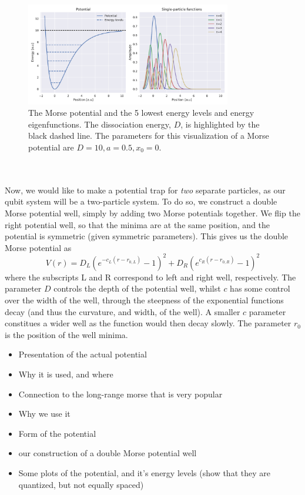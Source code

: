 \documentclass{subfiles}
\begin{document}
\begin{figure}
    \centering
    \includegraphics[width=0.8\textwidth]{figs/potential_spf.pdf}
    \caption{The Morse potential and the 5 lowest energy levels and energy eigenfunctions. The dissociation energy, $D$, is highlighted by the black dashed line. The parameters for this visualization of a Morse potential are $D=10, a=0.5, x_0=0$.}
    \label{fig:morse_potential}
\end{figure}


\\ \\Now, we would like to make a potential trap for \emph{two} separate particles, as our qubit system will be a two-particle system. To do so, we construct a double Morse potential well, simply by adding two Morse potentials together. We flip the right potential well, so that the minima are at the same position, and the potential is symmetric (given symmetric parameters). This gives us the double Morse potential as
\begin{equation}
    V(r) = D_L(e^{-c_L(r-r_{0,L})} - 1)^2 + D_R(e^{c_R(r-r_{0,R})} - 1)^2
\end{equation}
where the subscripts L and R correspond to left and right well, respectively. The parameter $D$ controls the depth of the potential well, whilst $c$ has some control over the width of the well, through the steepness of the exponential functions decay (and thus the curvature, and width, of the well). A smaller $c$ parameter constitues a wider well as the function would then decay slowly. The parameter $r_0$ is the position of the well minima. 

\begin{itemize}
    \item Presentation of the actual potential
    \item Why it is used, and where
    \item Connection to the long-range morse that is very popular
    \item Why we use it
    \item Form of the potential
    \item our construction of a double Morse potential well
    \item Some plots of the potential, and it's energy levels (show that they are quantized, but not equally spaced)
\end{itemize}
\end{document}
